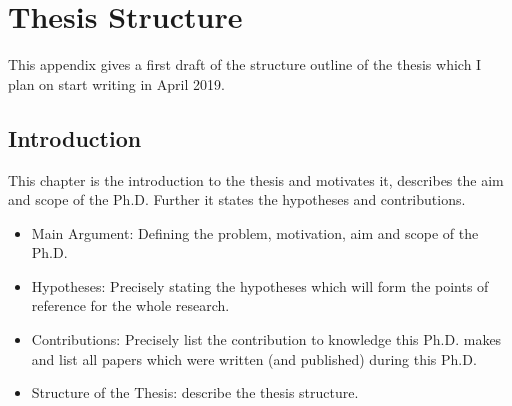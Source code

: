 \chapter{Thesis Structure}
\label{app:thesis_struct}

This appendix gives a first draft of the structure outline of the thesis which I plan on start writing in April 2019.

%

\section{Introduction}
This chapter is the introduction to the thesis and motivates it, describes the aim and scope of the Ph.D. Further it states the hypotheses and contributions.
\begin{itemize}
	\item Main Argument: Defining the problem, motivation, aim and scope of the Ph.D.
	\item Hypotheses: Precisely stating the hypotheses which will form the points of reference for the whole research.
	\item Contributions: Precisely list the contribution to knowledge this Ph.D. makes and list all papers which were written (and published) during this Ph.D.
	\item Structure of the Thesis: describe the thesis structure.
\end{itemize}

